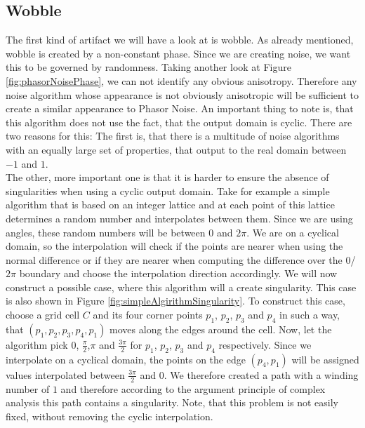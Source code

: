 \documentclass{utue} %
\begin{document}
\subsection{Wobble}\label{sec:wobble}
The first kind of artifact we will have a look at is wobble. As already mentioned, wobble is created by a non-constant phase. Since we are creating noise, we want this to be governed by randomness. Taking another look at Figure \ref{fig:phasorNoisePhase}, we can not identify any obvious anisotropy. Therefore any noise algorithm whose appearance is not obviously anisotropic will be sufficient to create a similar appearance to Phasor Noise. An important thing to note is, that this algorithm does not use the fact, that the output domain is cyclic. There are two reasons for this: The first is, that there is a multitude of noise algorithms with an equally large set of properties, that output to the real domain between $-1$ and $1$.\\
The other, more important one is that it is harder to ensure the absence of singularities when using a cyclic output domain. Take for example a simple algorithm that is based on an integer lattice and at each point of this lattice determines a random number and interpolates between them. Since we are using angles, these random numbers will be between $0$ and $2\pi$. We are on a cyclical domain, so the interpolation will check if the points are nearer when using the normal difference or if they are nearer when computing the difference over the $0$/$2\pi$ boundary and choose the interpolation direction accordingly. We will now construct a possible case, where this algorithm will a create singularity. This case is also shown in Figure \ref{fig:simpleAlgirithmSingularity}. To construct this case, choose a grid cell $C$ and its four corner points $p_1$, $p_2$, $p_3$ and $p_4$ in such a way, that $(p_1,p_2,p_3,p_4,p_1)$ moves along the edges around the cell. Now, let the algorithm pick $0$, $\frac{\pi}{2}$,$\pi$ and $\frac{3\pi}{2}$ for $p_1$, $p_2$, $p_3$ and $p_4$ respectively. Since we interpolate on a cyclical domain, the points on the edge $(p_4,p_1)$ will be assigned values interpolated between $\frac{3\pi}{2}$ and $0$. We therefore created a path with a winding number of $1$ and therefore according to the argument principle of complex analysis this path contains a singularity. Note, that this problem is not easily fixed, without removing the cyclic interpolation.\\
\end{document}
